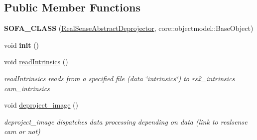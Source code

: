 \subsection*{Public Member Functions}
\begin{DoxyCompactItemize}
\item 
\mbox{\label{classsofa_1_1rgbdtracking_1_1_real_sense_abstract_deprojector_a595c10a0bf6eb93a562e9cb12dd269b7}} 
{\bfseries S\+O\+F\+A\+\_\+\+C\+L\+A\+SS} (\hyperlink{classsofa_1_1rgbdtracking_1_1_real_sense_abstract_deprojector}{Real\+Sense\+Abstract\+Deprojector}, core\+::objectmodel\+::\+Base\+Object)
\item 
\mbox{\label{classsofa_1_1rgbdtracking_1_1_real_sense_abstract_deprojector_ac809ca0096bb6ec5f003194ecef42533}} 
void {\bfseries init} ()
\item 
\mbox{\label{classsofa_1_1rgbdtracking_1_1_real_sense_abstract_deprojector_a9b933303db901af2174388a524b671a1}} 
void \hyperlink{classsofa_1_1rgbdtracking_1_1_real_sense_abstract_deprojector_a9b933303db901af2174388a524b671a1}{read\+Intrinsics} ()
\begin{DoxyCompactList}\small\item\em read\+Intrinsics reads from a specified file (data \char`\"{}intrinsics\char`\"{}) to rs2\+\_\+intrinsics cam\+\_\+intrinsics \end{DoxyCompactList}\item 
\mbox{\label{classsofa_1_1rgbdtracking_1_1_real_sense_abstract_deprojector_a7b8c549b1df30b374c1431594bcac52b}} 
void \hyperlink{classsofa_1_1rgbdtracking_1_1_real_sense_abstract_deprojector_a7b8c549b1df30b374c1431594bcac52b}{deproject\+\_\+image} ()
\begin{DoxyCompactList}\small\item\em deproject\+\_\+image dispatches data processing depending on data (link to realsense cam or not) \end{DoxyCompactList}\item 
\mbox{\label{classsofa_1_1rgbdtracking_1_1_real_sense_abstract_deprojector_ac0889ca4dee6e9980f9f28909d6f3ba6}} 

\end{DoxyCompactItemize}
